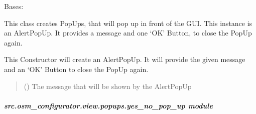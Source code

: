 \documentclass[letterpaper,10pt,english]{sphinxmanual}
\begin{document}
\begin{fulllineitems}
\label{\detokenize{apidoc/src.osm_configurator.view.popups:src.osm_configurator.view.popups.alert_pop_up.AlertPopUp}}
\pysigstartsignatures
{}
\pysigstopsignatures
\sphinxAtStartPar
Bases: 

\sphinxAtStartPar
This class creates PopUps, that will pop up in front of the GUI.
This instance is an Alert\sphinxhyphen{}PopUp. It provides a message and one ‘OK’ Button, to close the PopUp again.

\begin{fulllineitems}
\label{\detokenize{apidoc/src.osm_configurator.view.popups:src.osm_configurator.view.popups.alert_pop_up.AlertPopUp.__init__}}
\pysigstartsignatures
{}
\pysigstopsignatures
\sphinxAtStartPar
This Constructor will create an AlertPopUp. It will provide the given message and an ‘OK’ Button to close
the PopUp again.
\begin{quote}\begin{description}
\sphinxAtStartPar
{} () \textendash{} The message that will be shown by the AlertPopUp

\end{description}\end{quote}

\end{fulllineitems}


\end{fulllineitems}



\subparagraph{src.osm\_configurator.view.popups.yes\_no\_pop\_up module}
\label{\detokenize{apidoc/src.osm_configurator.view.popups:module-src.osm_configurator.view.popups.yes_no_pop_up}}\label{\detokenize{apidoc/src.osm_configurator.view.popups:src-osm-configurator-view-popups-yes-no-pop-up-module}}
\end{document}

